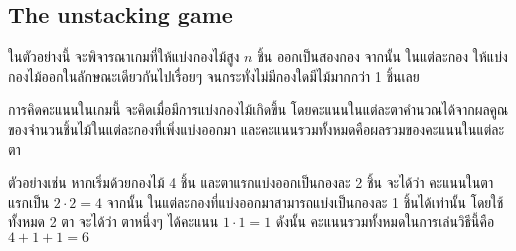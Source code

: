 \subsection{The unstacking game}

ในตัวอย่างนี้ จะพิจารณาเกมที่ให้แบ่งกองไม้สูง $n$ ชิ้น ออกเป็นสองกอง จากนั้น ในแต่ละกอง ให้แบ่งกองไม้ออกในลักษณะเดียวกันไปเรื่อยๆ จนกระทั่งไม่มีกองใดมีไม้มากกว่า 1 ชิ้นเลย

การคิดคะแนนในเกมนี้ จะคิดเมื่อมีการแบ่งกองไม้เกิดขึ้น โดยคะแนนในแต่ละตาคำนวณได้จากผลคูณของจำนวนชิ้นไม้ในแต่ละกองที่เพิ่งแบ่งออกมา และคะแนนรวมทั้งหมดคือผลรวมของคะแนนในแต่ละตา

ตัวอย่างเช่น หากเริ่มด้วยกองไม้ 4 ชิ้น และตาแรกแบ่งออกเป็นกองละ 2 ชิ้น จะได้ว่า คะแนนในตาแรกเป็น $2\cdot 2=4$ จากนั้น ในแต่ละกองที่แบ่งออกมาสามารถแบ่งเป็นกองละ 1 ชิ้นได้เท่านั้น โดยใช้ทั้งหมด 2 ตา จะได้ว่า ตาหนึ่งๆ ได้คะแนน $1\cdot 1=1$ ดังนั้น คะแนนรวมทั้งหมดในการเล่นวิธีนี้คือ $4+1+1=6$

